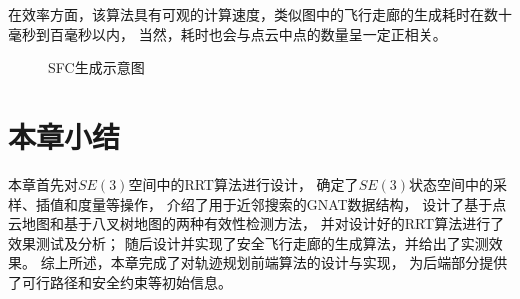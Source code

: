 在效率方面，该算法具有可观的计算速度，类似图中的飞行走廊的生成耗时在数十毫秒到百毫秒以内，
当然，耗时也会与点云中点的数量呈一定正相关。

\begin{figure}[!ht]
  \setlength{\subfigcapskip}{-1bp}
  \centering
  \begin{minipage}{\textwidth}

  \centering
  \subfigure{\label{fig:sfc_overview}}\addtocounter{subfigure}{-2}
  \hspace{0.2em}
  \subfigure{\label{fig:sfc_detail_1}}\addtocounter{subfigure}{-2}
  \hspace{0.2em}
  \subfigure{\label{fig:sfc_detail_2}}\addtocounter{subfigure}{-2}
  
  \end{minipage}
  \caption{SFC生成示意图}
  \label{fig:sfc_generation}
\end{figure}
\section{本章小结}\label{sec:summary_3}
本章首先对$SE(3)$空间中的RRT算法进行设计，
确定了$SE(3)$状态空间中的采样、插值和度量等操作，
介绍了用于近邻搜索的GNAT数据结构，
设计了基于点云地图和基于八叉树地图的两种有效性检测方法，
并对设计好的RRT算法进行了效果测试及分析；
随后设计并实现了安全飞行走廊的生成算法，并给出了实测效果。
综上所述，本章完成了对轨迹规划前端算法的设计与实现，
为后端部分提供了可行路径和安全约束等初始信息。
